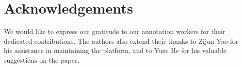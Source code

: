 \section*{Acknowledgements}
We would like to express our gratitude to our annotation workers for their dedicated contributions. The authors also extend their thanks to Zijun Yao for his assistance in maintaining the platform, and to Yuze He for his valuable suggestions on the paper.

\newpage

